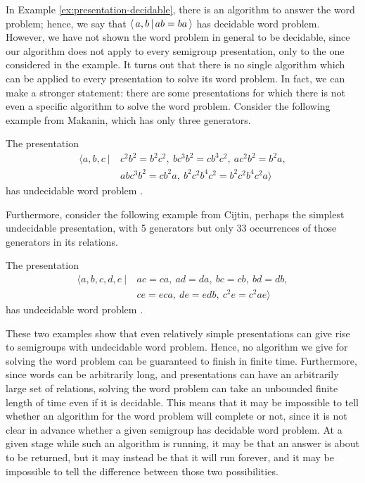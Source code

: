 In Example \ref{ex:presentation-decidable}, there is an algorithm to answer the
word problem; hence, we
say that $\left\langle \, a,b \, \middle| \, ab=ba \, \right\rangle$ has decidable word problem.  However, we have not shown the word
problem in general to be decidable, since our algorithm does not apply to every
semigroup presentation, only to the one considered in the example.  It turns out
that there is no single algorithm which can be applied to every presentation to
solve its word problem.  In fact, we can make a stronger statement: there are
some presentations for which there is not even a specific algorithm to solve
the word problem.  Consider the
following example from Makanin, which has only three generators.

\begin{example}[Makanin, 1966]
  \label{ex:makanin}
  The presentation
  \begin{align*}
    \langle a,b,c ~|~ & c^2b^2 = b^2c^2,\ bc^3b^2 = cb^3c^2,\ ac^2b^2 = b^2a,\\
                      & abc^3b^2 = cb^2a,\ b^2c^2b^4c^2 = b^2c^2b^4c^2a \rangle
  \end{align*}
  has undecidable word problem \cite{makanin_1966}.
\end{example}

Furthermore, consider the following example from Cijtin, perhaps the
simplest undecidable presentation, with 5 generators but only 33 occurrences of
those generators in its relations.

\begin{example}[Cijtin, 1957]
  \label{ex:cijtin}
  The presentation
  \begin{align*}
    \langle a,b,c,d,e ~|~ & ac=ca,\ ad=da,\ bc=cb,\ bd=db,\\
                          & ce=eca,\ de=edb,\ c^2e=c^2ae \rangle
  \end{align*}
  has undecidable word problem
  \cite{cijtin_1957, collins_1986}.
\end{example}

These two examples show that even relatively simple presentations can give rise
to semigroups with undecidable word problem.  Hence, no algorithm we give for
solving the word problem can be guaranteed to finish in finite time.
Furthermore, since words can be arbitrarily long, and presentations can have an
arbitrarily large set of relations, solving the word problem can take an
unbounded finite length of time even if it is decidable.  This means that it may
be impossible to tell whether an algorithm for the word problem will complete or
not, since it is not clear in advance whether a given semigroup has decidable
word problem.  At a given stage while such an algorithm is running, it may be
that an answer is about to be returned, but it may instead be that it will run
forever, and it may be impossible to tell the difference between those two
possibilities.

